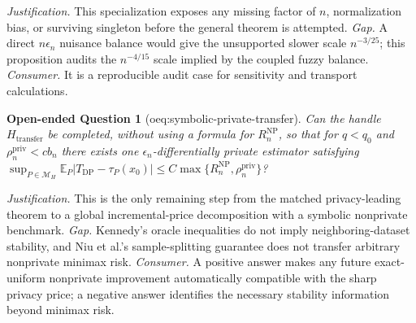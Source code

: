 \documentclass{article}
\newtheorem{openendedquestion}{Open-ended Question}
\begin{document}
\par\smallskip\noindent \textit{Justification.} This specialization exposes any missing factor of \(n\), normalization bias, or surviving singleton before the general theorem is attempted. \textit{Gap.} A direct \(n\epsilon_n\) nuisance balance would give the unsupported slower scale \(n^{-3/25}\); this proposition audits the \(n^{-4/15}\) scale implied by the coupled fuzzy balance. \textit{Consumer.} It is a reproducible audit case for sensitivity and transport calculations.

\begin{openendedquestion}[oeq:symbolic-private-transfer]\label{oeq:symbolic-private-transfer}
Can the handle \(H_{\mathrm{transfer}}\) be completed, without using a formula for \(R_n^{\mathrm{NP}}\), so that for \(q<q_0\) and \(\rho_n^{\mathrm{priv}}<c b_n\) there exists one \(\epsilon_n\)-differentially private estimator satisfying \(\sup_{P\in\mathcal M_H}\mathbb E_P|T_{\mathrm{DP}}-\tau_P(x_0)|\le C\max\{R_n^{\mathrm{NP}},\rho_n^{\mathrm{priv}}\}\)?
\end{openendedquestion}
\par\smallskip\noindent \textit{Justification.} This is the only remaining step from the matched privacy-leading theorem to a global incremental-price decomposition with a symbolic nonprivate benchmark. \textit{Gap.} Kennedy's oracle inequalities do not imply neighboring-dataset stability, and Niu et al.'s sample-splitting guarantee does not transfer arbitrary nonprivate minimax risk. \textit{Consumer.} A positive answer makes any future exact-uniform nonprivate improvement automatically compatible with the sharp privacy price; a negative answer identifies the necessary stability information beyond minimax risk.
\end{document}
